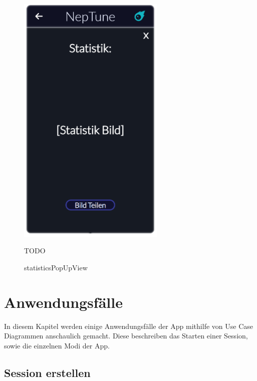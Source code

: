 \documentclass[oneside, ngerman]{sdqtechreport}
\begin{document}
\begin{figure}
    \hypertarget{statisticsPopUpView}{}
    \begin{minipage}[t]{7 cm}
        \vspace{-1.5ex}
        \includegraphics[width=7cm]{LATEX/Pflichtenheft/GraphicDesigns/statisticsPopUpPage.png}
        \caption{statisticsPopUpView}
    \end{minipage}
    \hspace{1cm}
    \begin{minipage}[t]{7 cm}
        \vspace{1cm}
        TODO
    \end{minipage}
\end{figure}


\chapter{Anwendungsfälle}
\label{chap:Anwendungsfälle}

In diesem Kapitel werden einige Anwendungsfälle der App mithilfe von Use Case Diagrammen anschaulich gemacht. Diese beschreiben das Starten einer Session, sowie die einzelnen Modi der App.

\section{Session erstellen}
\label{sec:Anwendungsfälle:Session erstellen}
\end{document}
